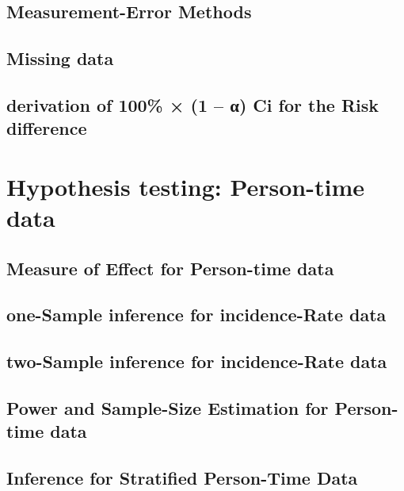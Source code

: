 \documentclass[12pt,]{article}
\theoremstyle{definition}
\theoremstyle{definition}
\theoremstyle{definition}
\theoremstyle{remark}
\begin{document}
\subsection{Measurement-Error Methods}\label{measurement-error-methods}

\subsection{Missing data}\label{missing-data}

\subsection{derivation of 100\% × (1 -- α) Ci for the Risk
difference}\label{derivation-of-100-1--ci-for-the-risk-difference}

\section{Hypothesis testing: Person-time
data}\label{hypothesis-testing-person-time-data}

\subsection{Measure of Effect for Person-time
data}\label{measure-of-effect-for-person-time-data}

\subsection{one-Sample inference for incidence-Rate
data}\label{one-sample-inference-for-incidence-rate-data}

\subsection{two-Sample inference for incidence-Rate
data}\label{two-sample-inference-for-incidence-rate-data}

\subsection{Power and Sample-Size Estimation for Person-time
data}\label{power-and-sample-size-estimation-for-person-time-data}

\subsection{Inference for Stratified Person-Time
Data}\label{inference-for-stratified-person-time-data}
\end{document}
